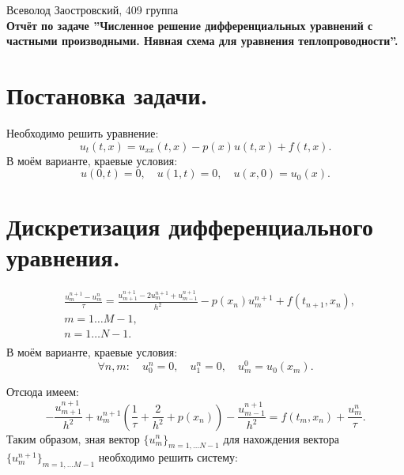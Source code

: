 \documentclass[14pt,a4paper]{extarticle}
\newcommand{\1}{\mathbbm{1}}
\begin{document}
\begin{center}

    {Всеволод Заостровский, 409 группа}\\
    {\bfseries Отчёт по задаче ''Численное решение дифференциальных уравнений с частными производными. Нявная схема для уравнения теплопроводности''.\\}
    \vspace{1cm}

\end{center}

\section{Постановка задачи.} Необходимо решить уравнение:
\begin{equation} \label{diffeq1}
    u_t(t, x) = u_{xx}(t, x) - p(x) u(t, x) + f(t, x).
\end{equation}
В моём варианте, краевые условия:
\begin{equation} \label{diffeqedge}
    u(0, t) = 0, \quad u(1, t) = 0, \quad u(x, 0) = u_0(x). 
\end{equation}
\section{Дискретизация дифференциального уравнения.}
\begin{align} \label{scheme1}
    &\frac{u_m^{n+1} - u_m^n}{\tau} = \frac{u_{m+1}^{n+1} - 2 u_{m}^{n+1} + u_{m-1}^{n+1}}{h^2} - p(x_n) u_m^{n+1} + f(t_{n+1}, x_n),\\ 
    & m = 1 \ldots M-1, \\
    & n = 1 \ldots N-1. \\
\end{align}
В моём варианте, краевые условия:
\begin{equation} \label{schemeedge}
    \forall n, m: \quad u_0^{n} = 0, \quad u_1^{n} = 0, \quad u_m^{0} = u_0(x_m). 
\end{equation}

Отсюда имеем:
\begin{equation*} \label{scheme1}
    -\frac{u_{m+1}^{n+1}}{h^2} + u_m^{n+1} (\frac{1}{\tau} + \frac{2}{h^2} + p(x_n)) - \frac{u_{m-1}^{n+1}}{h^2} = f(t_{m}, x_n) + \frac{u_m^n}{\tau}.
\end{equation*}
Таким образом, зная вектор $\{u_m^n\}_{m = 1, \ldots N-1}$ для нахождения вектора $\{u_m^{n+1}\}_{m = 1, \ldots M-1}$ необходимо решить систему:
\end{document}
